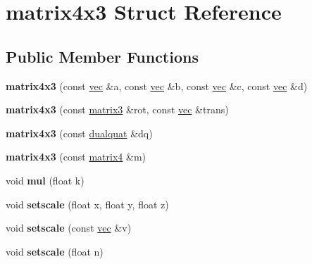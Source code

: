 \hypertarget{structmatrix4x3}{}\section{matrix4x3 Struct Reference}
\label{structmatrix4x3}
\subsection*{Public Member Functions}
\begin{DoxyCompactItemize}
\item 
\mbox{\label{structmatrix4x3_a8fbbf4dad81c6cb8bdce767a11ed506f}} 
{\bfseries matrix4x3} (const \hyperlink{structvec}{vec} \&a, const \hyperlink{structvec}{vec} \&b, const \hyperlink{structvec}{vec} \&c, const \hyperlink{structvec}{vec} \&d)
\item 
\mbox{\label{structmatrix4x3_ad3ea8845894639cac66efab8b31271d6}} 
{\bfseries matrix4x3} (const \hyperlink{structmatrix3}{matrix3} \&rot, const \hyperlink{structvec}{vec} \&trans)
\item 
\mbox{\label{structmatrix4x3_a5ae49f06fec42b8f934d5b0d04cc11fd}} 
{\bfseries matrix4x3} (const \hyperlink{structdualquat}{dualquat} \&dq)
\item 
\mbox{\label{structmatrix4x3_a750e9ce9af8e7c1505aeaba531e9eb02}} 
{\bfseries matrix4x3} (const \hyperlink{structmatrix4}{matrix4} \&m)
\item 
\mbox{\label{structmatrix4x3_af3947833fb2ca74aa63a447105f65f5f}} 
void {\bfseries mul} (float k)
\item 
\mbox{\label{structmatrix4x3_a16fd801f0e98cf6fe5ed547eb53b5638}} 
void {\bfseries setscale} (float x, float y, float z)
\item 
\mbox{\label{structmatrix4x3_a4b6729c2362d5bbffa69271ad4ec216f}} 
void {\bfseries setscale} (const \hyperlink{structvec}{vec} \&v)
\item 
\mbox{\label{structmatrix4x3_a78106c2afeef687e48be8a2728ffe03d}} 
void {\bfseries setscale} (float n)
\item 

\end{DoxyCompactItemize}
